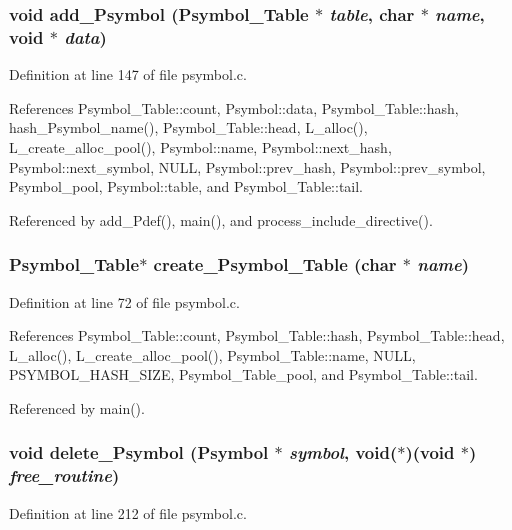 \subsubsection{\setlength{\rightskip}{0pt plus 5cm}void add\_\-Psymbol (\bf{Psymbol\_\-Table} $\ast$ {\em table}, char $\ast$ {\em name}, void $\ast$ {\em data})}\label{psymbol_8c_43c4935d67bb3583c3e7f4a50bc07bff}




Definition at line 147 of file psymbol.c.

References Psymbol\_\-Table::count, Psymbol::data, Psymbol\_\-Table::hash, hash\_\-Psymbol\_\-name(), Psymbol\_\-Table::head, L\_\-alloc(), L\_\-create\_\-alloc\_\-pool(), Psymbol::name, Psymbol::next\_\-hash, Psymbol::next\_\-symbol, NULL, Psymbol::prev\_\-hash, Psymbol::prev\_\-symbol, Psymbol\_\-pool, Psymbol::table, and Psymbol\_\-Table::tail.

Referenced by add\_\-Pdef(), main(), and process\_\-include\_\-directive().
\subsubsection{\setlength{\rightskip}{0pt plus 5cm}\bf{Psymbol\_\-Table}$\ast$ create\_\-Psymbol\_\-Table (char $\ast$ {\em name})}\label{psymbol_8c_8f6a98d5bf33556e5bbe7f8e940a0f81}




Definition at line 72 of file psymbol.c.

References Psymbol\_\-Table::count, Psymbol\_\-Table::hash, Psymbol\_\-Table::head, L\_\-alloc(), L\_\-create\_\-alloc\_\-pool(), Psymbol\_\-Table::name, NULL, PSYMBOL\_\-HASH\_\-SIZE, Psymbol\_\-Table\_\-pool, and Psymbol\_\-Table::tail.

Referenced by main().
\subsubsection{\setlength{\rightskip}{0pt plus 5cm}void delete\_\-Psymbol (\bf{Psymbol} $\ast$ {\em symbol}, void($\ast$)(void $\ast$) {\em free\_\-routine})}\label{psymbol_8c_21ac4b8e5e7b5a95b9d3cac63c5a6562}




Definition at line 212 of file psymbol.c.


